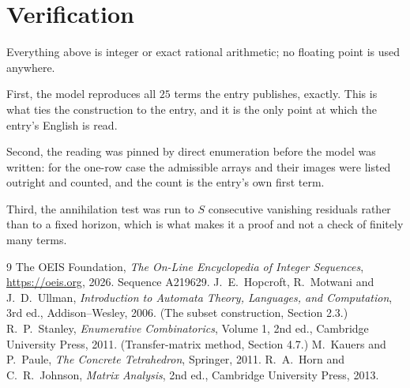 \documentclass[11pt,a4paper]{article}
\theoremstyle{plain}
\theoremstyle{definition}
\begin{document}
\section{Verification}

Everything above is integer or exact rational arithmetic; no floating point is used anywhere.

First, the model reproduces all $25$ terms the entry publishes, exactly. This is what
ties the construction to the entry, and it is the only point at which the entry's English is
read.

Second, the reading was pinned by direct enumeration before the model was written: for the
one-row case the admissible arrays and their images were listed outright and counted, and the
count is the entry's own first term.

Third, the annihilation test was run to $S$ consecutive vanishing residuals rather than to a
fixed horizon, which is what makes it a proof and not a check of finitely many terms.

\begin{thebibliography}{9}
 The OEIS Foundation, \emph{The On-Line Encyclopedia of Integer
Sequences}, \url{https://oeis.org}, 2026. Sequence A219629.
 J.~E.~Hopcroft, R.~Motwani and J.~D.~Ullman, \emph{Introduction to Automata
Theory, Languages, and Computation}, 3rd ed., Addison--Wesley, 2006. (The subset
construction, Section 2.3.)
 R.~P.~Stanley, \emph{Enumerative Combinatorics}, Volume 1, 2nd ed.,
Cambridge University Press, 2011. (Transfer-matrix method, Section 4.7.)
 M.~Kauers and P.~Paule, \emph{The Concrete Tetrahedron}, Springer, 2011.
 R.~A.~Horn and C.~R.~Johnson, \emph{Matrix Analysis}, 2nd ed., Cambridge
University Press, 2013.
\end{thebibliography}
\end{document}
